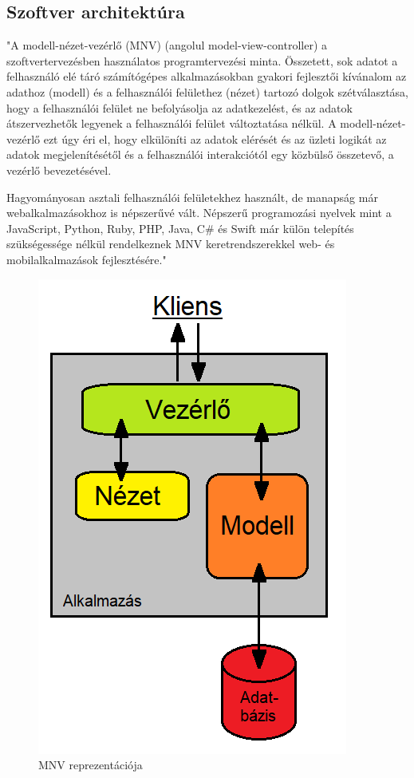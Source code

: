 \subsection{Szoftver architektúra}

"A modell-nézet-vezérlő (MNV) (angolul model-view-controller) a szoftvertervezésben használatos programtervezési minta. Összetett, sok adatot a felhasználó elé táró számítógépes alkalmazásokban gyakori fejlesztői kívánalom az adathoz (modell) és a felhasználói felülethez (nézet) tartozó dolgok szétválasztása, hogy a felhasználói felület ne befolyásolja az adatkezelést, és az adatok átszervezhetők legyenek a felhasználói felület változtatása nélkül. A modell-nézet-vezérlő ezt úgy éri el, hogy elkülöníti az adatok elérését és az üzleti logikát az adatok megjelenítésétől és a felhasználói interakciótól egy közbülső összetevő, a vezérlő bevezetésével.

Hagyományosan asztali felhasználói felületekhez használt, de manapság már webalkalmazásokhoz is népszerűvé vált. Népszerű programozási nyelvek mint a JavaScript, Python, Ruby, PHP, Java, C\# és Swift már külön telepítés szükségessége nélkül rendelkeznek MNV keretrendszerekkel web- és mobilalkalmazások fejlesztésére."\cite{mvc}

\begin{figure}[h]
	\centering
	\includegraphics[scale= 0.8]{images/MNV-reprezentáció.png}
	\caption{MNV reprezentációja}
	\label{fig:mnv}
\end{figure}

